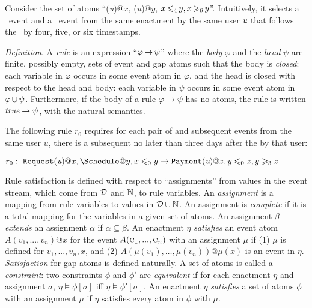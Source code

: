 \begin{examp}
Consider the set of atoms
``\Request(\mbox{\em u})$@x$, \Schedule(\mbox{\em u})$@y$,
$x \,{\leqslant_{4}}\, y, x\,{\geqslant_{6}}\, y$''.
Intuitively, it selects
a \Request\ event and a \Schedule\ event
from the same enactment
by the same user $\mbox{\em u}$
that follows the \Request\ by four, five, or six timestamps.
\end{examp}

{\it Definition}.
A {\em rule} is an expression
``$\varphi\,{\to}\,\psi$''
where the {\em body} $\varphi$
and the {\em head} $\psi$
are finite, possibly empty,
sets of event and gap atoms
such that
the body is {\em closed}:
each variable in $\varphi$
occurs in some event atom in $\varphi$, and
the head is closed with respect to the head and body:
each variable in $\psi$
occurs in some event atom in $\varphi\,{\cup}\,\psi$.
Furthermore,
if the body of a rule $\varphi\rightarrow\psi$
has no atoms,
the rule is written $\textit{true}\rightarrow\psi$,
with the natural semantics.
  
\begin{examp}\label{ex:rule}
  The following rule $r_0$ requires
  for each pair of {\Request} and subsequent {\Schedule} events
  from the same user $u$,
  there is a subsequent {\Payment} no later than three days after the {\Schedule}
  by that user:

  \begin{center}
  $r_{0}:\ \Request(\mbox{\em u})@x, \Schedule@y, x\leq_{0}y
  \rightarrow
  \Payment(\mbox{\em u})@z, y\leq_{0} z, y\geq_{3} z$
  \end{center}
  \vspace{-2.5em}
\end{examp}

Rule satisfaction is defined
with respect to ``assignments''
from values in the event stream,
which come from $\mathcal{D}$ and $\mathbb{N}$,
to rule variables.
An {\em assignment} is a mapping 
from rule variables to values in $\mathcal{D}\cup\mathbb{N}$.
An assignment is {\em complete} if it is a total mapping
for the variables in a given set of atoms.
An assignment $\beta$ {\em extends} an assignment $\alpha$
if $\alpha\subseteq\beta$.
An enactment $\eta$ {\em satisfies}
an event atom $A(v_1,...,v_n)@x$
for the event $A(\textsc{c}_1, ..., \textsc{c}_n)$
with an assignment $\mu$
if
(1) $\mu$ is defined for $v_1,...,v_n,x$, and
(2) $A(\mu(v_1),\dots,\mu(v_n))@\mu(x)$
is an event in $\eta$.
{\em Satisfaction} for gap atoms is defined naturally.
A set of atoms is called a {\em constraint}:
two constraints $\phi$ and $\phi'$ are {\em equivalent} if
for each enactment $\eta$ and assignment $\sigma$,
$\eta\models\phi[\sigma]$ iff $\eta\models\phi'[\sigma]$.
An enactment $\eta$ {\em satisfies}
a set of atoms $\phi$
with an assignment $\mu$
if $\eta$ satisfies every atom in $\phi$ with $\mu$.

